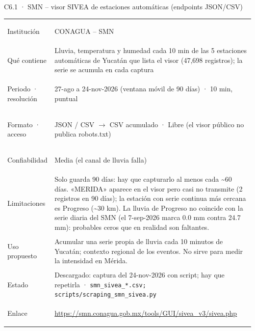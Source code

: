 \documentclass[11pt,a4paper]{article}
\begin{document}
\begin{ficha}{C6.1 · SMN – visor SIVEA de estaciones automáticas (endpoints JSON/CSV)}
\begin{tabularx}{\linewidth}{@{}>{\leavevmode\color{tinta2}\bfseries\raggedright\arraybackslash}p{2.9cm}X@{}}
Institución & CONAGUA – SMN \\
Qué contiene & Lluvia, temperatura y humedad cada 10 min de las 5 estaciones automáticas de Yucatán que lista el visor (47,698 registros); la serie se acumula en cada captura \\
Periodo · resolución & 27-ago a 24-nov-2026 (ventana móvil de 90 días) · 10 min, puntual \\
Formato · acceso & JSON / CSV $\rightarrow$ CSV acumulado · Libre (el visor público no publica robots.txt) \\
Confiabilidad & Media (el canal de lluvia falla) \\
Limitaciones & Solo guarda 90 días: hay que capturarlo al menos cada \textasciitilde{}60 días. «MERIDA» aparece en el visor pero casi no transmite (2 registros en 90 días); la estación con serie continua más cercana es Progreso (\textasciitilde{}30 km). La lluvia de Progreso no coincide con la serie diaria del SMN (el 7-sep-2026 marca 0.0 mm contra 24.7 mm): probables ceros que en realidad son faltantes. \\
Uso propuesto & Acumular una serie propia de lluvia cada 10 minutos de Yucatán; contexto regional de los eventos. No sirve para medir la intensidad en Mérida. \\
Estado & Descargado: captura del 24-nov-2026 con script; hay que repetirla · {\small\nolinkurl{smn_sivea_*.csv; scripts/scraping_smn_sivea.py}} \\
Enlace & \url{https://smn.conagua.gob.mx/tools/GUI/sivea_v3/sivea.php} \\
\end{tabularx}
\end{ficha}
\end{document}
